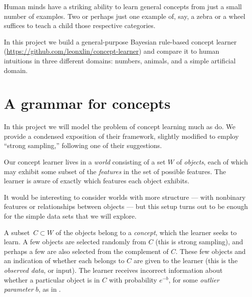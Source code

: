 \documentclass[apacite,jou]{apa6}
\author{Leon Lin}
\affiliation{\mbox{}}
\begin{document}
\maketitle    
                        
Human minds have a striking ability to learn general concepts from
just a small number of examples. Two or perhaps just one example of,
say, a zebra or a wheel suffices to teach a child those respective
categories.

In this project we build a 
general-purpose Bayesian rule-based concept learner
(\url{https://github.com/leonxlin/concept-learner}) and compare
it to human intuitions in three different domains: numbers, animals,
and a simple artificial domain. 

\section{A grammar for concepts}

In this project we will
model the problem of concept learning much as 
\citet*{rrdnf} do. We provide a 
condensed exposition of their framework, slightly modified to
employ ``strong sampling,'' following one of their suggestions.

Our concept learner lives in a \emph{world}
consisting of a set $W$ of \emph{objects}, each of which may exhibit
some subset of the \emph{features} in the set of possible features.
The learner is aware of exactly which features each object exhibits.

It would be interesting to consider worlds with more structure ---
with nonbinary features or relationships between objects ---
but this setup turns out to be enough for the simple data sets
that we will explore.

A subset~$C\subset W$ of the objects
 belong to a \emph{concept}, which the learner
seeks to learn. A few objects are selected randomly from $C$
(this is strong sampling), and
perhaps a few are also selected from the complement of $C$. These few
objects and an indication of whether each belongs to $C$ are given to
the learner (this is the \emph{observed data}, or input).
 The learner receives
incorrect information about whether a particular object is in $C$ 
with probability $e^{-b}$, for some \emph{outlier parameter} $b$,
as in \citet{rrdnf}.
\end{document}

